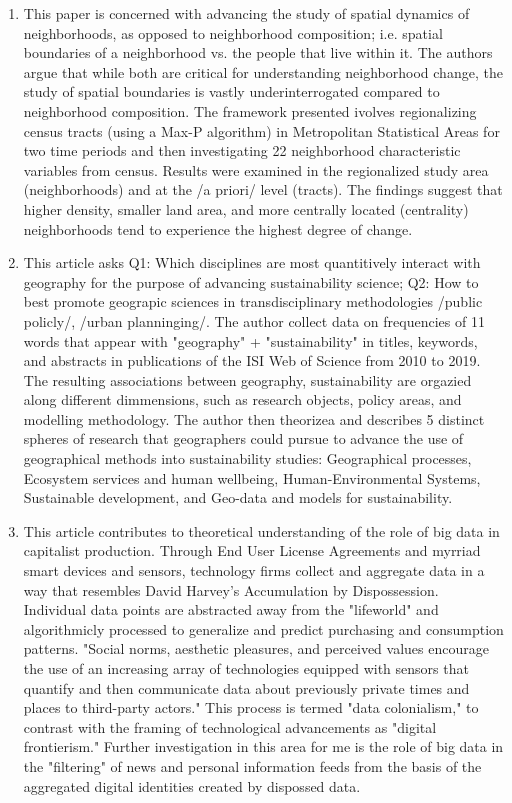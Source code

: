 \documentclass{article}
\begin{document}
\begin{enumerate}
\item \cite{rey2011MeasuringSpatial}
  
This paper is concerned with advancing the study of spatial dynamics
of neighborhoods, as opposed to neighborhood composition; i.e. spatial
boundaries of a neighborhood vs. the people that live within it. The
authors argue that while both are critical for understanding
neighborhood change, the study of spatial boundaries is vastly
underinterrogated compared to neighborhood composition. The framework
presented ivolves regionalizing census tracts (using a Max-P
algorithm) in Metropolitan Statistical Areas for two time periods and
then investigating 22 neighborhood characteristic variables from
census. Results were examined in the regionalized study area
(neighborhoods) and at the /a priori/ level (tracts). The findings
suggest that higher density, smaller land area, and more centrally
located (centrality) neighborhoods tend to experience the highest
degree of change.


\item \cite{fu2020PromotingGeography}

This article asks Q1: Which disciplines are most quantitively interact
with geography for the purpose of advancing sustainability science;
Q2: How to best promote geograpic sciences in transdisciplinary
methodologies /public policly/, /urban planninging/. The author
collect data on frequencies of 11 words that appear with "geography" +
"sustainability" in titles, keywords, and abstracts in publications of
the ISI Web of Science from 2010 to 2019. The resulting associations
between geography, sustainability are orgazied along different
dimmensions, such as research objects, policy areas, and modelling
methodology. The author then theorizea and describes 5 distinct
spheres of research that geographers could pursue to advance the use
of geographical methods into sustainability studies: Geographical
processes, Ecosystem services and human wellbeing, Human-Environmental
Systems, Sustainable development, and Geo-data and models for
sustainability.


\item \cite{thatcher2016DataColonialism}

This article contributes to theoretical understanding of the role of
big data in capitalist production. Through End User License Agreements
and myrriad smart devices and sensors, technology firms collect and
aggregate data in a way that resembles David Harvey's Accumulation by
Dispossession. Individual data points are abstracted away from the
"lifeworld" and algorithmicly processed to generalize and predict
purchasing and consumption patterns. "Social norms, aesthetic
pleasures, and perceived values encourage the use of an increasing
array of technologies equipped with sensors that quantify and then
communicate data about previously private times and places to
third-party actors." This process is termed "data colonialism," to
contrast with the framing of technological advancements as "digital
frontierism." Further investigation in this area for me is the role of
big data in the "filtering" of news and personal information feeds
from the basis of the aggregated digital identities created by
dispossed data.



\end{enumerate}
\end{document}
